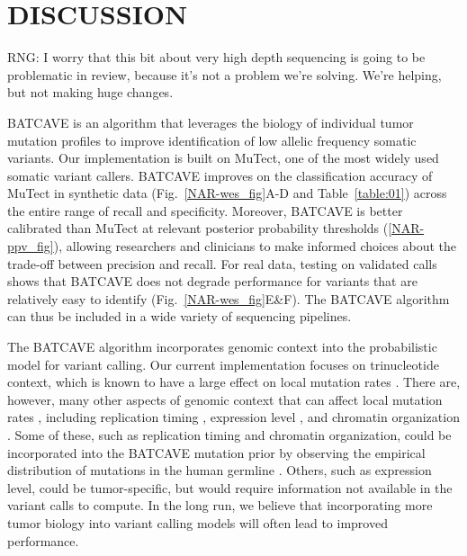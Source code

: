 \documentclass[a4,center,fleqn]{NAR}
\newcommand{\rngcomment}[1]{{\color{red}RNG: #1}}
\newcommand{\batcave}{BATCAVE\xspace}
\begin{document}
\section{DISCUSSION}
 
\rngcomment{I worry that this bit about very high depth sequencing is going to be problematic in review, because it's not a problem we're solving. We're helping, but not making huge changes.}

\batcave is an algorithm that leverages the biology of individual tumor mutation profiles to improve identification of low allelic frequency somatic variants.
Our implementation is built on MuTect, one of the most widely used somatic variant callers.
\batcave improves on the classification accuracy of MuTect in synthetic data (Fig.~\ref{NAR-wes_fig}A-D and Table~\ref{table:01}) across the entire range of recall and specificity.
Moreover, \batcave is better calibrated than MuTect at relevant posterior probability thresholds (\ref{NAR-ppv_fig}), allowing researchers and clinicians to make informed choices about the trade-off between precision and recall.
For real data, testing on validated calls shows that \batcave does not degrade performance for variants that are relatively easy to identify (Fig.~\ref{NAR-wes_fig}E\&F).
The \batcave algorithm can thus be included in a wide variety of sequencing pipelines.

The \batcave algorithm incorporates genomic context into the probabilistic model for variant calling.
Our current implementation focuses on trinucleotide context, which is known to have a large effect on local mutation rates \cite{Martincorena2015,Hollstein2017}.
There are, however, many other aspects of genomic context that can affect local mutation rates \citep{Buisson2019}, including replication timing \citep{Stamatoyannopoulos2009}, expression level \citep{Pleasance2010}, and chromatin organization \citep{Schuster-Bockler2012}. 
Some of these, such as replication timing and chromatin organization, could be incorporated into the \batcave mutation prior by observing the empirical distribution of mutations in the human germline \cite{Hodgkinson2011}.
Others, such as expression level, could be tumor-specific, but would require information not available in the variant calls to compute.
In the long run, we believe that incorporating more tumor biology into variant calling models will often lead to improved performance.
\end{document}
